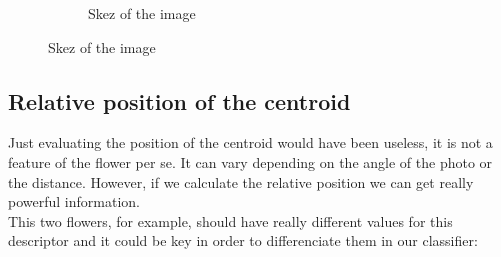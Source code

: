 \documentclass[11]{article}
\begin{document}
\begin{figure}[H]
\begin{subfigure}[t]{.49\linewidth}
    \caption{Skez of the image}
    \label{skez}
    \end{subfigure}
\end{figure}


\subsection{Relative position of the centroid}

Just evaluating the position of the centroid would have been useless, it is not a feature of the flower per se. It can vary depending on the angle of the photo or the distance. However, if we calculate the relative position we can get really powerful information. 
\\

This two flowers, for example, should have really different values for this descriptor and it could be key in order to differenciate them in our classifier:
\end{document}
